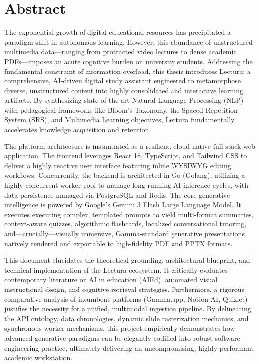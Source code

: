 \chapter*{Abstract}
\begin{SingleSpace}
The exponential growth of digital educational resources has precipitated a paradigm shift in autonomous learning. However, this abundance of unstructured multimedia data—ranging from protracted video lectures to dense academic PDFs—imposes an acute cognitive burden on university students. Addressing the fundamental constraint of information overload, this thesis introduces Lectura: a comprehensive, AI-driven digital study assistant engineered to metamorphose diverse, unstructured content into highly consolidated and interactive learning artifacts. By synthesizing state-of-the-art Natural Language Processing (NLP) with pedagogical frameworks like Bloom's Taxonomy, the Spaced Repetition System (SRS), and Multimedia Learning objectives, Lectura fundamentally accelerates knowledge acquisition and retention.

The platform architecture is instantiated as a resilient, cloud-native full-stack web application. The frontend leverages React 18, TypeScript, and Tailwind CSS to deliver a highly reactive user interface featuring inline WYSIWYG editing workflows. Concurrently, the backend is architected in Go (Golang), utilizing a highly concurrent worker pool to manage long-running AI inference cycles, with data persistence managed via PostgreSQL and Redis. The core generative intelligence is powered by Google’s Gemini 3 Flash Large Language Model. It executes executing complex, templated prompts to yield multi-format summaries, context-aware quizzes, algorithmic flashcards, localized conversational tutoring, and—crucially—visually immersive, Gamma-standard generative presentations natively rendered and exportable to high-fidelity PDF and PPTX formats.

This document elucidates the theoretical grounding, architectural blueprint, and technical implementation of the Lectura ecosystem. It critically evaluates contemporary literature on AI in education (AIEd), automated visual instructional design, and cognitive retrieval strategies. Furthermore, a rigorous comparative analysis of incumbent platforms (Gamma.app, Notion AI, Quizlet) justifies the necessity for a unified, multimodal ingestion pipeline. By delineating the API ontology, data chronologies, dynamic slide rasterization mechanics, and synchronous worker mechanisms, this project empirically demonstrates how advanced generative paradigms can be elegantly codified into robust software engineering practice, ultimately delivering an uncompromising, highly performant academic workstation.
\end{SingleSpace}

